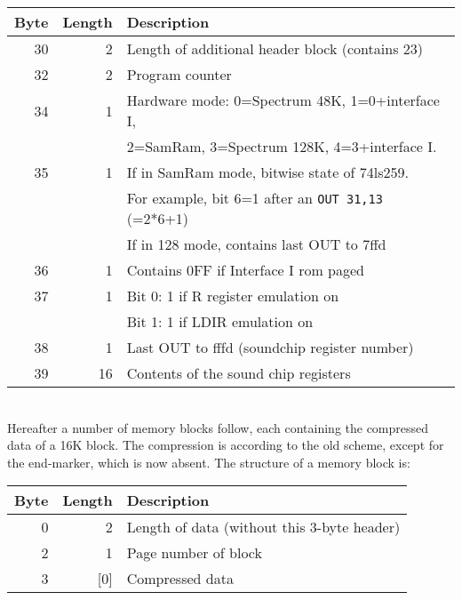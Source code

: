 \begin{tabular}{|r|r|l|}
	\hline
        Byte &   Length &  Description \\
	\hline
	\hline
        30   &   2   &    Length of additional header block (contains 23)  \\ 
        32   &   2   &    Program counter				   \\
        34   &   1   &    Hardware mode: 0=Spectrum 48K, 1=0+interface I,  \\
             &       &    2=SamRam, 3=Spectrum 128K, 4=3+interface I.      \\
        35   &   1   &    If in SamRam mode, bitwise state of 74ls259.     \\
             &       &    For example, bit 6=1 after an \verb|OUT 31,13|
			                                  (=2*6+1) \\
             &       &    If in 128 mode, contains last OUT to 7ffd	   \\
        36   &   1   &    Contains 0FF if Interface I rom paged		   \\
        37   &   1   &    Bit 0: 1 if R register emulation on		   \\
             &       &    Bit 1: 1 if LDIR emulation on			   \\
        38   &   1   &    Last OUT to fffd (soundchip register number)     \\
        39   &   16  &    Contents of the sound chip registers 		   \\
	\hline
\end{tabular}\\

\noindent
    Hereafter a number of memory blocks follow, each containing the
    compressed data of a 16K block.  The compression is according to the old
    scheme, except for the end-marker, which is now absent.  The structure
    of a memory block is:\\

\begin{tabular}{|r|r|l|}
	\hline
        Byte &   Length & Description 					\\
	\hline
	\hline
        0    &   2      & Length of data (without this 3-byte header)   \\
        2    &   1      & Page number of block				\\
        3    &   [0]    & Compressed data				\\
	\hline
\end{tabular}\\

